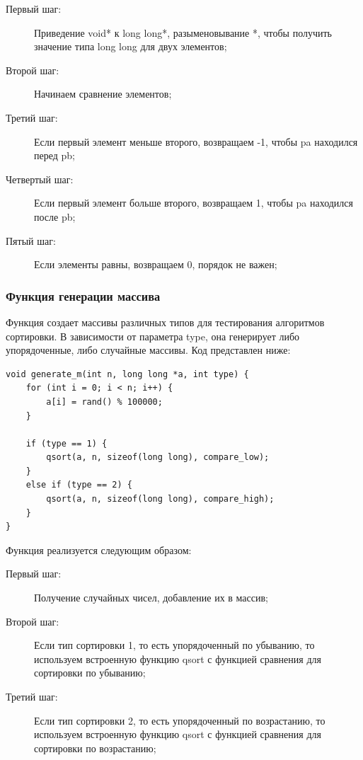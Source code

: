 \documentclass[a4paper,12pt,titlepage,finall]{article}
\begin{document}
\begin{description}
\item[Первый шаг:] Приведение void* к long long*, разыменовывание *, чтобы получить значение типа long long для двух элементов;

\item[Второй шаг:] Начинаем сравнение элементов;

\item[Третий шаг:] Если первый элемент меньше второго, возвращаем -1, чтобы pa находился перед pb;

\item[Четвертый шаг:] Если первый элемент больше второго, возвращаем 1, чтобы pa находился после pb;

\item[Пятый шаг:] Если элементы равны, возвращаем 0, порядок не важен;
\end{description}



\subsubsection{Функция генерации массива}
Функция создает массивы различных типов для тестирования алгоритмов сортировки. В зависимости от параметра type, она генерирует либо упорядоченные, либо случайные массивы.
Код представлен ниже:

\begin{verbatim}
void generate_m(int n, long long *a, int type) {
    for (int i = 0; i < n; i++) {
        a[i] = rand() % 100000;
    }
    
    if (type == 1) {
        qsort(a, n, sizeof(long long), compare_low);
    }
    else if (type == 2) {
        qsort(a, n, sizeof(long long), compare_high);
    }
}
\end{verbatim}

Функция реализуется следующим образом:

\begin{description}
\item[Первый шаг:] Получение случайных чисел, добавление их в массив;

\item[Второй шаг:] Если тип сортировки 1, то есть упорядоченный по убыванию, то используем встроенную функцию qsort с функцией сравнения для сортировки по убыванию;

\item[Третий шаг:] Если тип сортировки 2, то есть упорядоченный по возрастанию, то используем встроенную функцию qsort с функцией сравнения для сортировки по возрастанию;

\end{description}
\end{document}
